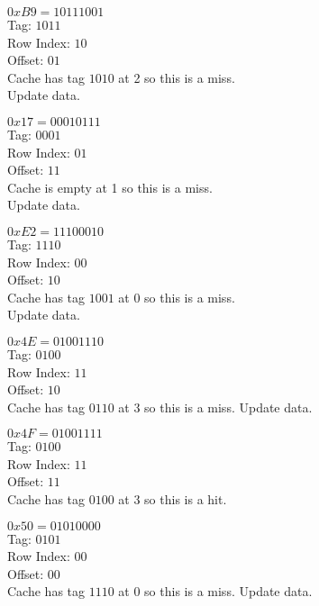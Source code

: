 \documentclass{article}
\begin{document}
{     $0xB9 = 1011 1001$ \\
     Tag: $1011$ \\
     Row Index: $10$ \\
     Offset: $01$ \\
     Cache has tag $1010$ at 2 so this is a miss. \\
     Update data. \\
     \linebreak

     $0x17 = 0001 0111$ \\
     Tag: $0001$ \\
     Row Index: $01$ \\
     Offset: $11$ \\
     Cache is empty at 1 so this is a miss. \\
     Update data. \\
     \linebreak

     $0xE2 = 1110 0010$ \\
     Tag: $1110$ \\
     Row Index: $00$ \\
     Offset: $10$ \\
     Cache has tag $1001$ at 0 so this is a miss. \\
     Update data. \\
     \linebreak

     $0x4E = 0100 1110$ \\
     Tag: $0100$ \\
     Row Index: $11$ \\
     Offset: $10$ \\
     Cache has tag $0110$ at 3 so this is a miss.
     Update data.
     \linebreak

     $0x4F = 0100 1111$ \\
     Tag: $0100$ \\
     Row Index: $11$ \\
     Offset: $11$ \\
     Cache has tag $0100$ at 3 so this is a hit.
     \linebreak

     $0x50 = 0101 0000$ \\
     Tag: $0101$ \\
     Row Index: $00$ \\
     Offset: $00$ \\
     Cache has tag $1110$ at 0 so this is a miss.
     Update data. \\
     \linebreak

}
\end{document}
